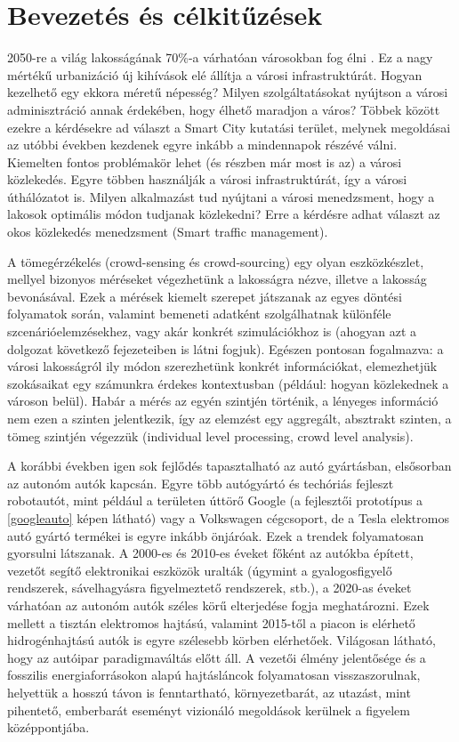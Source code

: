 \documentclass[a4paper,12pt]{report}
\begin{document}
\chapter{Bevezetés és célkitűzések}

2050-re a világ lakosságának 70\%-a várhatóan városokban fog élni \cite{unpopulation}. Ez a nagy mértékű urbanizáció új kihívások elé állítja a városi infrastruktúrát. Hogyan kezelhető egy ekkora méretű népesség? Milyen szolgáltatásokat nyújtson a városi adminisztráció annak érdekében, hogy élhető maradjon a város? Többek között ezekre a kérdésekre ad választ a Smart City kutatási terület, melynek megoldásai az utóbbi években kezdenek egyre inkább a mindennapok részévé válni. Kiemelten fontos problémakör lehet (és részben már most is az) a városi közlekedés. Egyre többen használják a városi infrastruktúrát, így a városi úthálózatot is. Milyen alkalmazást tud nyújtani a városi menedzsment, hogy a lakosok optimális módon tudjanak közlekedni? Erre a kérdésre adhat választ az okos közlekedés menedzsment (Smart traffic management).

A tömegérzékelés (crowd-sensing és crowd-sourcing) egy olyan eszközkészlet, mellyel bizonyos méréseket végezhetünk a lakosságra nézve, illetve a lakosság bevonásával. Ezek a mérések kiemelt szerepet játszanak az egyes döntési folyamatok során, valamint bemeneti adatként szolgálhatnak különféle szcenárióelemzésekhez, vagy akár konkrét szimulációkhoz is (ahogyan azt a dolgozat következő fejezeteiben is látni fogjuk). Egészen pontosan fogalmazva: a városi lakosságról ily módon szerezhetünk konkrét információkat, elemezhetjük szokásaikat egy számunkra érdekes kontextusban (például: hogyan közlekednek a városon belül). Habár a mérés az egyén szintjén történik, a lényeges információ nem ezen a szinten jelentkezik, így az elemzést egy aggregált, absztrakt szinten, a tömeg szintjén végezzük (individual level processing, crowd level analysis).

A korábbi években igen sok fejlődés tapasztalható az autó gyártásban, elsősorban az autonóm autók kapcsán. Egyre több autógyártó és techóriás fejleszt robotautót, mint például a területen úttörő Google (a fejlesztői prototípus a \ref{googleauto} képen látható) vagy a Volkswagen cégcsoport, de a Tesla elektromos autó gyártó termékei is egyre inkább önjáróak. Ezek a trendek folyamatosan gyorsulni látszanak. A 2000-es és 2010-es éveket főként az autókba épített, vezetőt segítő elektronikai eszközök uralták (úgymint a gyalogosfigyelő rendszerek, sávelhagyásra figyelmeztető rendszerek, stb.), a 2020-as éveket várhatóan az autonóm autók széles körű elterjedése fogja meghatározni. Ezek mellett a tisztán elektromos hajtású, valamint 2015-től a piacon is elérhető hidrogénhajtású autók is egyre szélesebb körben elérhetőek. Világosan látható, hogy az autóipar paradigmaváltás előtt áll. A vezetői élmény jelentősége és a fosszilis energiaforrásokon alapú hajtásláncok folyamatosan visszaszorulnak, helyettük a hosszú távon is fenntartható, környezetbarát, az utazást, mint pihentető, emberbarát eseményt vizionáló megoldások kerülnek a figyelem középpontjába.
\end{document}
